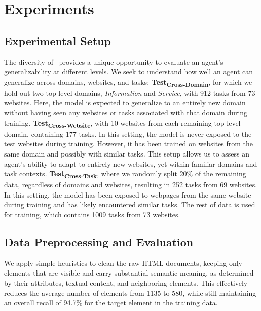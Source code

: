 \section{Experiments}

\subsection{Experimental Setup}
\label{sec:data_split}
The diversity of \mind\ provides a unique opportunity to evaluate an agent's generalizability at different levels.
We seek to understand how well an agent can generalize across domains, websites, and tasks:
\textbf{Test\textsubscript{Cross-Domain}},
for which we hold out two top-level domains, \textit{Information} and \textit{Service}, with \num{912} tasks from \num{73} websites. Here, the model is expected to generalize to an entirely new domain without having seen any websites or tasks associated with that domain during training.
\textbf{Test\textsubscript{Cross-Website}},
with \num{10} websites from each remaining top-level domain, containing \num{177} tasks. In this setting, the model is never exposed to the test websites during training. However, it has been trained on websites from the same domain and possibly with similar tasks. 
This setup allows us to assess an agent's ability to adapt to entirely new websites, yet within familiar domains and task contexts.
\textbf{Test\textsubscript{Cross-Task}},
where we randomly split \num{20}\% of the remaining data, regardless of domains and websites, resulting in \num{252} tasks from \num{69} websites. In this setting, the model has been exposed to webpages from the same website during training and has likely encountered similar tasks.
The rest of data is used for training, which contains \num{1009} tasks from \num{73} websites.

\subsection{Data Preprocessing and Evaluation}
\label{sec:evaluation}
We apply simple heuristics to clean the raw HTML documents, keeping only elements that are visible and carry substantial semantic meaning, as determined by their attributes, textual content, and neighboring elements. This effectively reduces the average number of elements from \num{1135} to \num{580}, while still maintaining an overall recall of \num{94.7}\% for the target element in the training data.


